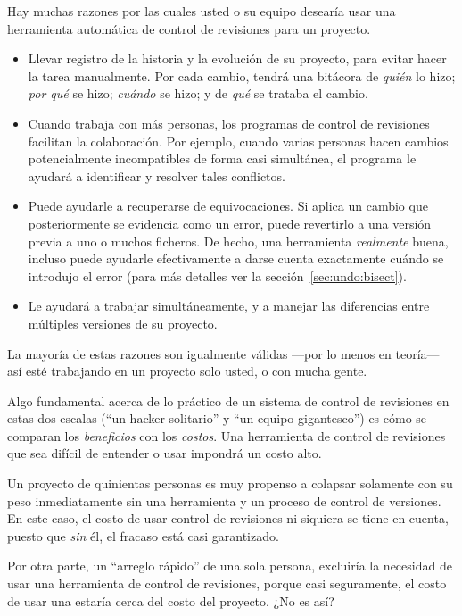 Hay muchas razones por las cuales usted o su equipo desearía usar una
herramienta automática de control de revisiones para un proyecto.
\begin{itemize}
\item Llevar registro de la historia y la evolución de su proyecto, para
  evitar hacer la tarea manualmente. Por cada cambio, tendrá una
  bitácora de \emph{quién} lo hizo; \emph{por qué} se hizo;
  \emph{cuándo} se hizo; y de \emph{qué} se trataba el cambio.
\item Cuando trabaja con más personas, los programas de control de
  revisiones facilitan la colaboración.  Por ejemplo, cuando varias
  personas hacen cambios potencialmente incompatibles de forma casi
  simultánea, el programa le ayudará a identificar y resolver tales
  conflictos.
\item Puede ayudarle a recuperarse de equivocaciones. Si aplica un
  cambio que posteriormente se evidencia como un error, puede
  revertirlo a una versión previa a uno o muchos ficheros. De hecho,
  una herramienta \emph{realmente} buena, incluso puede ayudarle
  efectivamente a darse cuenta exactamente cuándo se introdujo el
  error (para más detalles ver la sección~\ref{sec:undo:bisect}).
\item Le ayudará a trabajar simultáneamente, y a manejar las diferencias
  entre múltiples versiones de su proyecto.
\end{itemize}
La mayoría de estas razones son igualmente válidas ---por lo menos en
teoría--- así esté trabajando en un proyecto solo usted, o con mucha gente.

Algo fundamental acerca de lo práctico de un sistema de control de
revisiones en estas dos escalas (``un hacker solitario'' y ``un equipo
gigantesco'') es cómo se comparan los \emph{beneficios} con los
\emph{costos}.  Una herramienta de control de revisiones que sea
difícil de entender o usar impondrá un costo alto.

Un proyecto de quinientas personas es muy propenso a colapsar
solamente con su peso inmediatamente sin una herramienta y un proceso
de control de versiones. En este caso, el costo de usar control de
revisiones ni siquiera se tiene en cuenta, puesto que \emph{sin} él,
el fracaso está casi garantizado.

Por otra parte, un ``arreglo rápido'' de una sola persona, excluiría
la necesidad de usar una herramienta de control de revisiones, porque
casi seguramente, el costo de usar una estaría cerca del costo del
proyecto. ¿No es así?

